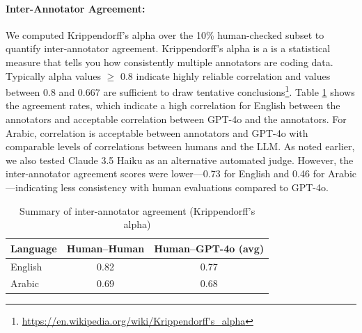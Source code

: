 \documentclass[letterpaper]{article}
\begin{document}
\paragraph{Inter-Annotator Agreement:} We computed Krippendorff’s alpha over the 10\% human-checked subset to quantify inter-annotator agreement. Krippendorff’s alpha is a  is a statistical measure that tells you how consistently multiple annotators are coding data.  Typically alpha values $\geq$ 0.8 indicate highly reliable correlation and values between 0.8 and 0.667 are sufficient to draw tentative conclusions\footnote{\url{https://en.wikipedia.org/wiki/Krippendorff's_alpha}}. Table \ref{tab:alpha_summary} shows the agreement rates, which indicate a high correlation for English between the annotators and acceptable correlation between GPT-4o and the annotators.  For Arabic, correlation is acceptable between annotators and GPT-4o with comparable levels of correlations between humans and the LLM. As noted earlier, we also tested Claude 3.5 Haiku as an alternative automated judge. However, the inter-annotator agreement scores were lower—0.73 for English and 0.46 for Arabic—indicating less consistency with human evaluations compared to GPT-4o.



\begin{table}[h]
    \centering
    \begin{tabular}{l|c|c}
        Language & Human–Human & Human–GPT-4o (avg) \\ \hline
        English  & 0.82                 & 0.77 \\
        Arabic   & 0.69                 & 0.68\\
    \end{tabular}
    \caption{Summary of inter-annotator agreement (Krippendorff’s alpha)}
    \label{tab:alpha_summary}
\end{table}


\end{document}
